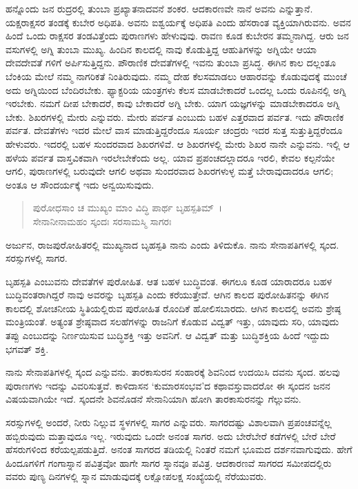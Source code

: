 ಹನ್ನೊಂದು ಜನ ರುದ್ರರಲ್ಲಿ ತುಂಬಾ ಪ್ರಖ್ಯಾತನಾದವನೆ ಶಂಕರ. ಆದಕಾರಣವೇ ನಾನೆ ಅವನು ಎನ್ನುತ್ತಾನೆ. ಯಕ್ಷರಾಕ್ಷಸರ ತಂಡಕ್ಕೆ ಕುಬೇರ ಅಧಿಪತಿ. ಅವನು ಐಶ್ವರ್ಯಕ್ಕೆ ಅಧಿಪತಿ ಎಂದು ಹೆಸರಾಂತ ವ್ಯಕ್ತಿಯಾಗಿರುವನು. ಅವನ ಹಿಂದೆ ಒಂದು ರಾಕ್ಷಸರ ತಂಡವಿತ್ತೆಂದು ಪುರಾಣಗಳು ಹೇಳುವುವು. ರಾವಣ ಕೂಡ ಕುಬೇರನ ತಮ್ಮನಾಗಿದ್ದ. ಆರು ಜನ ವಸುಗಳಲ್ಲಿ ಅಗ್ನಿ ತುಂಬಾ ಮುಖ್ಯ. ಹಿಂದಿನ ಕಾಲದಲ್ಲಿ ನಾವು ಕೊಡುತ್ತಿದ್ದ ಆಹುತಿಗಳನ್ನು ಅಗ್ನಿಯೇ ಆಯಾ ದೇವದೇವತೆ ಗಳಿಗೆ ಅರ್ಪಿಸುತ್ತಿದ್ದನು. ಪೌರಾಣಿಕ ದೇವತೆಗಳಲ್ಲಿ ಇವನು ತುಂಬಾ ಪ್ರಸಿದ್ಧ. ಈಗಿನ ಕಾಲ ದಲ್ಲಂತೂ ಬೆಂಕಿಯ ಮೇಲೆ ನಮ್ಮ ನಾಗರಿಕತೆ ನಿಂತಿರುವುದು. ನಮ್ಮ ದೇಹ ಕೆಲಸಮಾಡಲು ಆಹಾರವನ್ನು ಕೊಡುವುದಕ್ಕೆ ಮುಂಚೆ ಅದು ಅಗ್ನಿಯಿಂದ ಬೆಂದಿರಬೇಕು. ಫ್ಯಾಕ್ಟರಿಯ ಯಂತ್ರಗಳು ಕೆಲಸ ಮಾಡಬೇಕಾದರೆ ಒಂದಲ್ಲ ಒಂದು ರೂಪಿನಲ್ಲಿ ಅಗ್ನಿ ಇರಬೇಕು. ನಮಗೆ ದೀಪ ಬೇಕಾದರೆ, ಕಾವು ಬೇಕಾದರೆ ಅಗ್ನಿ ಬೇಕು. ಯಾಗ ಯಜ್ಞಗಳನ್ನು ಮಾಡಬೇಕಾದರೂ ಅಗ್ನಿ ಬೇಕು. ಶಿಖರಗಳಲ್ಲಿ ಮೇರು ಎನ್ನುವರು. ಮೇರು ಪರ್ವತ ಎಂಬುದು ಬಹಳ ಎತ್ತರವಾದ ಪರ್ವತ. ಇದು ಪೌರಾಣಿಕ ಪರ್ವತ. ದೇವತೆಗಳು ಇದರ ಮೇಲೆ ವಾಸ ಮಾಡುತ್ತಿದ್ದರೆಂದೂ ಸೂರ್ಯ ಚಂದ್ರರು ಇದರ ಸುತ್ತ ಸುತ್ತುತ್ತಿದ್ದರೆಂದೂ ಹೇಳುವರು. ಇದರಲ್ಲಿ ಬಹಳ ಸುಂದರವಾದ ಶಿಖರಗಳಿವೆ. ಆ ಶಿಖರಗಳಲ್ಲಿ ಮೇರು ಶಿಖರ ನಾನೇ ಎನ್ನುವನು. ಇಲ್ಲಿ ಆ ಹಳೆಯ ಪರ್ವತ ವಾಸ್ತವಿಕವಾಗಿ ಇರಲೇಬೇಕೆಂದು ಅಲ್ಲ. ಯಾವ ಪ್ರಪಂಚದಲ್ಲಾದರೂ ಇರಲಿ, ಕೇವಲ ಕಲ್ಪನೆಯೇ ಆಗಲಿ, ಪುರಾಣಗಳಲ್ಲಿ ಬರುವುದೇ ಆಗಲಿ ಅಥವಾ ಸುಂದರವಾದ ಶಿಖರಗಳುಳ್ಳ ಮತ್ತೆ ಬೇರಾವುದಾದರೂ ಆಗಲಿ; ಅಂತೂ ಆ ಸೌಂದರ್ಯಕ್ಕೆ ಇದು ಅನ್ವಯಿಸುವುದು.

\begin{verse}
ಪುರೋಧಸಾಂ ಚ ಮುಖ್ಯಂ ಮಾಂ ವಿದ್ಧಿ ಪಾರ್ಥ ಬೃಹಸ್ಪತಿಮ್~।\\ಸೇನಾನೀನಾಮಹಂ ಸ್ಕಂದಃ ಸರಸಾಮಸ್ಮಿ ಸಾಗರಃ 
\end{verse}

{\small ಅರ್ಜುನ, ರಾಜಪುರೋಹಿತರಲ್ಲಿ ಮುಖ್ಯನಾದ ಬೃಹಸ್ಪತಿ ನಾನು ಎಂದು ತಿಳಿದುಕೊ. ನಾನು ಸೇನಾಪತಿಗಳಲ್ಲಿ ಸ್ಕಂದ. ಸರಸ್ಸುಗಳಲ್ಲಿ ಸಾಗರ.}

ಬೃಹಸ್ಪತಿ ಎಂಬುವನು ದೇವತೆಗಳ ಪುರೋಹಿತ. ಆತ ಬಹಳ ಬುದ್ಧಿವಂತ. ಈಗಲೂ ಕೂಡ ಯಾರಾದರೂ ಬಹಳ ಬುದ್ಧಿವಂತರಾಗಿದ್ದರೆ ನಾವು ಅವರನ್ನು ಬೃಹಸ್ಪತಿ ಎಂದು ಕರೆಯುತ್ತೇವೆ. ಆಗಿನ ಕಾಲದ ಪುರೋಹಿತನನ್ನು ಈಗಿನ ಕಾಲದಲ್ಲಿ ಶೋಚನೀಯ ಸ್ಥಿತಿಯಲ್ಲಿರುವ ಪುರೋಹಿತ ರೊಂದಿಕೆ ಹೋಲಿಸಬಾರದು. ಆಗಿನ ಕಾಲದಲ್ಲಿ ಅವನು ಶ್ರೇಷ್ಠ ಮಂತ್ರಿಯಂತೆ. ಅತ್ಯಂತ ಶ್ರೇಷ್ಠವಾದ ಸಲಹೆಗಳನ್ನು ರಾಜನಿಗೆ ಕೊಡುವ ವಿದ್ವತ್ ಇತ್ತು, ಯಾವುದು ಸರಿ, ಯಾವುದು ತಪ್ಪು ಎಂಬುದನ್ನು ನಿರ್ಣಯಿಸುವ ಬುದ್ಧಿಶಕ್ತಿ ಇತ್ತು ಅವನಿಗೆ. ಆ ವಿದ್ವತ್ ಮತ್ತು ಬುದ್ಧಿಶಕ್ತಿಯ ಹಿಂದೆ ಇದ್ದುದು ಭಗವತ್ ಶಕ್ತಿ.

ನಾನು ಸೇನಾಪತಿಗಳಲ್ಲಿ ಸ್ಕಂದ ಎನ್ನುವನು. ತಾರಕಾಸುರನ ಸಂಹಾರಕ್ಕೆ ಶಿವನಿಂದ ಉದಯಿಸಿ ದವನು ಸ್ಕಂದ. ಹಲವು ಪುರಾಣಗಳು ಇದನ್ನು ವಿವರಿಸುತ್ತವೆ. ಕಾಳಿದಾಸನ ‘ಕುಮಾರಸಂಭವ’ದ ಕಥಾವಸ್ತುವಾದರೋ ಈ ಸ್ಕಂದನ ಜನನ ವಿಷಯವಾಗಿಯೇ ಇದೆ. ಸ್ಕಂದನೇ ಶಿವನೊಡನೆ ಸೇನಾನಿಯಾಗಿ ಹೋಗಿ ತಾರಕಾಸುರನನ್ನು ಗೆಲ್ಲುವನು.

ಸರಸ್ಸುಗಳಲ್ಲಿ ಅಂದರೆ, ನೀರು ನಿಲ್ಲುವ ಸ್ಥಳಗಳಲ್ಲಿ ಸಾಗರ ಎನ್ನುವರು. ಸಾಗರದಷ್ಟು ವಿಶಾಲವಾಗಿ ಪ್ರಪಂಚವನ್ನೆಲ್ಲ ಹಬ್ಬಿರುವುದು ಮತ್ತಾವುದೂ ಇಲ್ಲ. ಇರುವುದು ಒಂದೇ ಅನಂತ ಸಾಗರ. ಅದು ಬೇರೆಬೇರೆ ಕಡೆಗಳಲ್ಲಿ ಬೇರೆ ಬೇರೆ ಹೆಸರುಗಳಿಂದ ಕರೆಯಲ್ಪಪಡುತ್ತಿದೆ. ಅನಂತ ಸಾಗರದ ತಡಿಯಲ್ಲಿ ನಿಂತರೆ ನಮಗೆ ಭೂಮದ ದರ್ಶನವಾಗುವುದು. ಹೇಗೆ ಹಿಂದೂಗಳಿಗೆ ಗಂಗಾಸ್ನಾನ ಪವಿತ್ರವೋ ಹಾಗೇ ಸಾಗರ ಸ್ನಾನವೂ ಪವಿತ್ರ. ಆದಕಾರಣವೆ ಸಾಗರದ ಸಮೀಪದಲ್ಲಿರು ವವರು ಪುಣ್ಯ ದಿನಗಳಲ್ಲಿ ಸ್ನಾನ ಮಾಡುವುದಕ್ಕೆ ಲಕ್ಷೋಪಲಕ್ಷ ಸಂಖ್ಯೆಯಲ್ಲಿ ನೆರೆಯುವರು.

